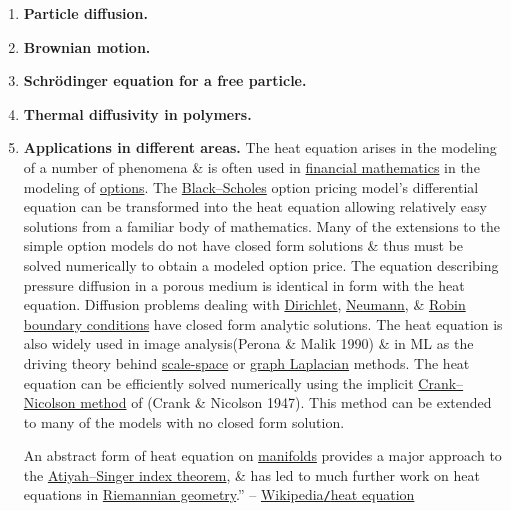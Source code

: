 \documentclass{article}
\begin{document}
\begin{enumerate}
	\item {\bf Particle diffusion.}
	\item {\bf Brownian motion.}
	\item {\bf Schrödinger equation for a free particle.}
	\item {\bf Thermal diffusivity in polymers.}
	\item {\bf Applications in different areas.} The heat equation arises in the modeling of a number of phenomena \& is often used in \href{https://en.wikipedia.org/wiki/Financial_mathematics}{financial mathematics} in the modeling of \href{https://en.wikipedia.org/wiki/Option_(finance)}{options}. The \href{https://en.wikipedia.org/wiki/Black%E2%80%93Scholes}{Black--Scholes} option pricing model's differential equation can be transformed into the heat equation allowing relatively easy solutions from a familiar body of mathematics. Many of the extensions to the simple option models do not have closed form solutions \& thus must be solved numerically to obtain a modeled option price. The equation describing pressure diffusion in a porous medium is identical in form with the heat equation. Diffusion problems dealing with \href{https://en.wikipedia.org/wiki/Dirichlet_boundary_conditions}{Dirichlet}, \href{https://en.wikipedia.org/wiki/Neumann_boundary_conditions}{Neumann}, \& \href{https://en.wikipedia.org/wiki/Robin_boundary_condition}{Robin boundary conditions} have closed form analytic solutions. The heat equation is also widely used in image analysis({\sc Perona \& Malik} 1990) \& in ML as the driving theory behind \href{https://en.wikipedia.org/wiki/Scale_space}{scale-space} or \href{https://en.wikipedia.org/wiki/Graph_Laplacian}{graph Laplacian} methods. The heat equation can be efficiently solved numerically using the implicit \href{https://en.wikipedia.org/wiki/Crank%E2%80%93Nicolson_method}{Crank--Nicolson method} of ({\sc Crank \& Nicolson} 1947). This method can be extended to many of the models with no closed form solution.
	
	An abstract form of heat equation on \href{https://en.wikipedia.org/wiki/Manifold}{manifolds} provides a major approach to the \href{https://en.wikipedia.org/wiki/Atiyah%E2%80%93Singer_index_theorem}{Atiyah--Singer index theorem}, \& has led to much further work on heat equations in \href{https://en.wikipedia.org/wiki/Riemannian_geometry}{Riemannian geometry}.'' -- \href{https://en.wikipedia.org/wiki/Heat_equation}{Wikipedia{\tt/}heat equation}
\end{enumerate}
\end{document}

